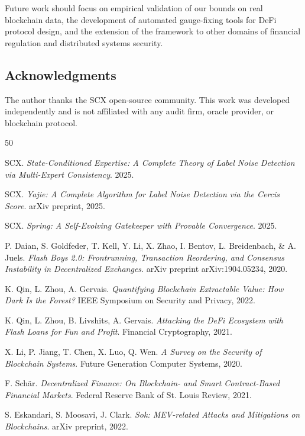 \documentclass[12pt,a4paper]{article}
\theoremstyle{remark}
\begin{document}
Future work should focus on empirical validation of our bounds on real
blockchain data, the development of automated gauge-fixing tools for DeFi
protocol design, and the extension of the framework to other domains of
financial regulation and distributed systems security.

\subsection*{Acknowledgments}

The author thanks the SCX open-source community. This work was developed
independently and is not affiliated with any audit firm, oracle provider, or
blockchain protocol.

\begin{thebibliography}{50}

SCX.
\textit{State-Conditioned Expertise: A Complete Theory of Label Noise Detection
via Multi-Expert Consistency}.
2025.

SCX.
\textit{Yajie: A Complete Algorithm for Label Noise Detection via the Cercis
Score}.
arXiv preprint, 2025.

SCX.
\textit{Spring: A Self-Evolving Gatekeeper with Provable Convergence}.
2025.

P. Daian, S. Goldfeder, T. Kell, Y. Li, X. Zhao, I. Bentov, L. Breidenbach,
\& A. Juels.
\textit{Flash Boys 2.0: Frontrunning, Transaction Reordering, and Consensus
Instability in Decentralized Exchanges}.
arXiv preprint arXiv:1904.05234, 2020.

K. Qin, L. Zhou, A. Gervais.
\textit{Quantifying Blockchain Extractable Value: How Dark Is the Forest?}
IEEE Symposium on Security and Privacy, 2022.

K. Qin, L. Zhou, B. Livshits, A. Gervais.
\textit{Attacking the DeFi Ecosystem with Flash Loans for Fun and Profit}.
Financial Cryptography, 2021.

X. Li, P. Jiang, T. Chen, X. Luo, Q. Wen.
\textit{A Survey on the Security of Blockchain Systems}.
Future Generation Computer Systems, 2020.

F. Sch\"{a}r.
\textit{Decentralized Finance: On Blockchain- and Smart Contract-Based
Financial Markets}.
Federal Reserve Bank of St. Louis Review, 2021.

S. Eskandari, S. Moosavi, J. Clark.
\textit{Sok: MEV-related Attacks and Mitigations on Blockchains}.
arXiv preprint, 2022.


\end{thebibliography}
\end{document}
